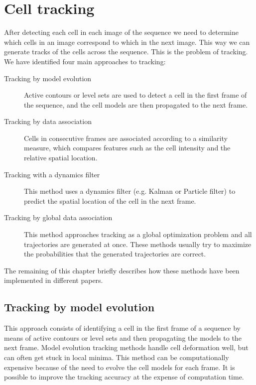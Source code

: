 \section{Cell tracking \statusfirstdraft}
\label{sec:tracking}

After detecting each cell in each image of the sequence we need to determine which cells in an image correspond to which in the next image. This way we can generate tracks of the cells across the sequence. This is the problem of tracking. We have identified four main approaches to tracking:

\begin{description}
	\item [Tracking by model evolution] Active contours or level sets are used to detect a cell in the first frame of the sequence, and the cell models are then propagated to the next frame.
	\item [Tracking by data association] Cells in consecutive frames are associated according to a similarity measure, which compares features such as the cell intensity and the relative spatial location.
	\item [Tracking with a dynamics filter] This method uses a dynamics filter (e.g. Kalman or Particle filter) to predict the spatial location of the cell in the next frame.
	\item [Tracking by global data association] This method approaches tracking as a global optimization problem and all trajectories are generated at once. These methods usually try to maximize the probabilities that the generated trajectories are correct.
\end{description}

The remaining of this chapter briefly describes how these methods have been implemented in different papers.

\subsection{Tracking by model evolution \statusfirstdraft}

This approach consists of identifying a cell in the first frame of a sequence by means of active contours or level sets and then propagating the models to the next frame. Model evolution tracking methods handle cell deformation well, but can often get stuck in local minima. This method can be computationally expensive because of the need to evolve the cell models for each frame. It is possible to improve the tracking accuracy at the expense of computation time.

